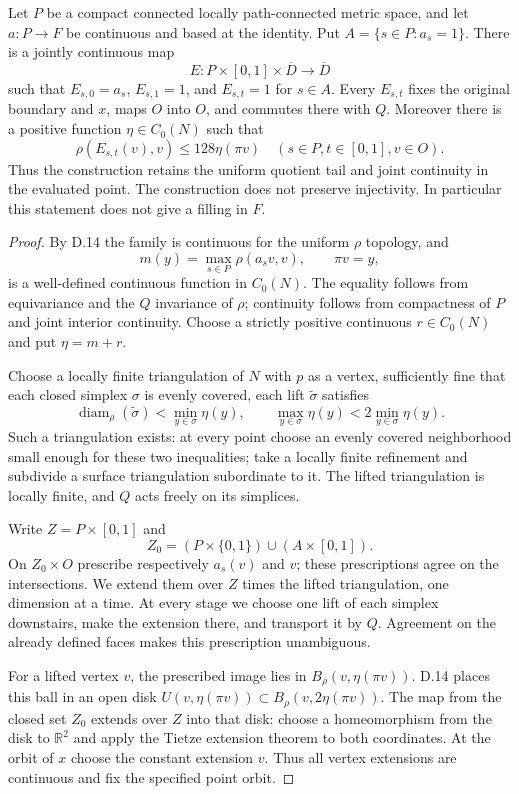 Let $P$ be a compact connected locally path-connected metric
space, and let $a:P\to F$ be continuous and based at the identity.
Put $A=\{s\in P:a_s=1\}$.
There is a jointly continuous map
\[
 E:P\times[0,1]\times\overline D\longrightarrow\overline D
\]
such that $E_{s,0}=a_s$, $E_{s,1}=1$, and $E_{s,t}=1$ for
$s\in A$.  Every $E_{s,t}$ fixes the original boundary and $x$,
maps $O$ into $O$, and commutes there with $Q$.
Moreover there is a positive function $\eta\in C_0(N)$ such that
\[
 \rho(E_{s,t}(v),v)\leq128\eta(\pi v)
 \quad(s\in P, t\in[0,1], v\in O).
\]
Thus the construction retains the uniform quotient tail and
joint continuity in the evaluated point.  The construction
does not preserve injectivity.
In particular this statement does not give a filling in $F$.
\begin{proof}
By D.14 the family is continuous for the uniform $\rho$ topology,
and
\[
 m(y)=\max_{s\in P}\rho(a_sv,v),\qquad \pi v=y,
\]
is a well-defined continuous function in $C_0(N)$.
The equality follows from equivariance and the $Q$ invariance of
$\rho$; continuity follows from compactness of $P$ and joint
interior continuity.  Choose a strictly positive continuous
$r\in C_0(N)$ and put $\eta=m+r$.

Choose a locally finite triangulation of $N$ with $p$ as a
vertex, sufficiently fine that each closed simplex $\sigma$ is
evenly covered, each lift $\widetilde\sigma$ satisfies
\[
 \operatorname{diam}_\rho(\widetilde\sigma)
       <\min_{y\in\sigma}\eta(y),
 \qquad
 \max_{y\in\sigma}\eta(y)<2\min_{y\in\sigma}\eta(y).
\]
Such a triangulation exists: at every point choose an evenly
covered neighborhood small enough for these two inequalities;
take a locally finite refinement and subdivide a surface
triangulation subordinate to it.  The lifted triangulation is
locally finite, and $Q$ acts freely on its simplices.

Write $Z=P\times[0,1]$ and
\[
 Z_0=(P\times\{0,1\})\cup(A\times[0,1]).
\]
On $Z_0\times O$ prescribe respectively $a_s(v)$ and $v$;
these prescriptions agree on the intersections.  We extend them
over $Z$ times the lifted triangulation, one dimension at a time.
At every stage we choose one lift of each simplex downstairs,
make the extension there, and transport it by $Q$.  Agreement
on the already defined faces makes this prescription unambiguous.

For a lifted vertex $v$, the prescribed image lies in
$B_\rho(v,\eta(\pi v))$.  D.14 places this ball in an open disk
$U(v,\eta(\pi v))\subset B_\rho(v,2\eta(\pi v))$.
The map from the closed set $Z_0$ extends over $Z$ into that
disk: choose a homeomorphism from the disk to $\mathbb R^2$
and apply the Tietze extension theorem to both coordinates.
At the orbit of $x$ choose the constant extension $v$.
Thus all vertex extensions are continuous and fix the specified
point orbit.


\end{proof}
